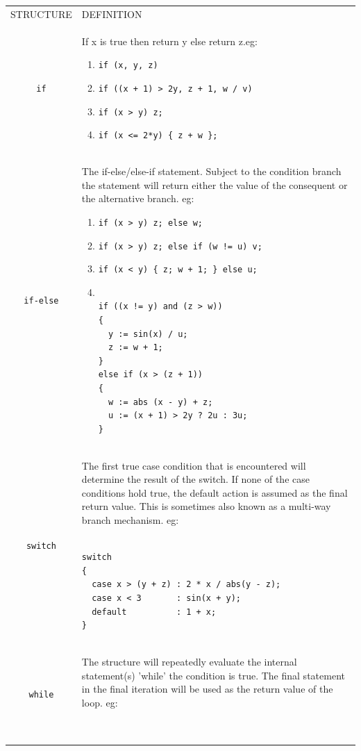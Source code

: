 \documentclass{book}
\begin{document}
{\newpage\clearpage
{}%
\begin{tabular}{|c|p{}|}
  \hline
STRUCTURE & DEFINITION\\
\verb'if'& If x is true then return y else return z.eg:
\begin{enumerate}
\item\verb"if (x, y, z)" 
\item\verb"if ((x + 1) > 2y, z + 1, w / v)"
\item\verb"if (x > y) z;"
\item\verb"if (x <= 2*y) { z + w };"
\end{enumerate}\\
\verb'if-else'& The if-else/else-if statement. Subject to the condition 
branch the statement will return either the value of the consequent or
the alternative branch. eg:
\begin{enumerate}
\item\verb"if (x > y) z; else w;"
\item\verb"if (x > y) z; else if (w != u) v;"
\item\verb"if (x < y) { z; w + 1; } else u;"
\item
\begin{verbatim}

if ((x != y) and (z > w))
{   
  y := sin(x) / u;
  z := w + 1;     
}                  
else if (x > (z + 1))
{                    
  w := abs (x - y) + z;
  u := (x + 1) > 2y ? 2u : 3u;
}\end{verbatim}

\end{enumerate}\\
\par\verb'switch'& The first true case condition that is encountered will 
determine the result of the switch. If none of the case
conditions hold true, the default action is assumed as 
the final return value. This is sometimes also known as
a multi-way branch mechanism.                          
eg:
\begin{verbatim}

switch                                                 
{                                                      
  case x > (y + z) : 2 * x / abs(y - z);               
  case x < 3       : sin(x + y);                       
  default          : 1 + x;                            
}\end{verbatim}

\\
\verb'while'& The structure will repeatedly evaluate the internal     
statement(s) 'while' the condition is true. The final  
statement in the final iteration will be used as the   
return value of the loop.                              
eg:                                                    
\begin{verbatim}


\end{verbatim}
\end{tabular}}
\end{document}
